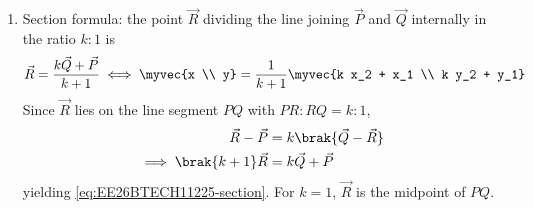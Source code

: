 \begin{enumerate}[label=\thesubsection.\arabic*, ref=\thesubsection.\theenumi]
\item Section formula: the point $\vec{R}$ dividing the line joining $\vec{P}$ and $\vec{Q}$ internally in the ratio $k : 1$ is
\begin{align}
	\vec{R} = \frac{k\vec{Q} + \vec{P}}{k + 1}
	\iff
	\myvec{x \\ y} = \frac{1}{k + 1}\myvec{k x_2 + x_1 \\ k y_2 + y_1}
	\label{eq:EE26BTECH11225-section}
\end{align}
\solution
Since $\vec{R}$ lies on the line segment $PQ$ with $PR : RQ = k : 1$,
\begin{align}
	\vec{R} - \vec{P} &= k\brak{\vec{Q} - \vec{R}}
	\\
	\implies \brak{k + 1}\vec{R} &= k\vec{Q} + \vec{P}
\end{align}
yielding \eqref{eq:EE26BTECH11225-section}. For $k = 1$, $\vec{R}$ is the midpoint of $PQ$.


\end{enumerate}
